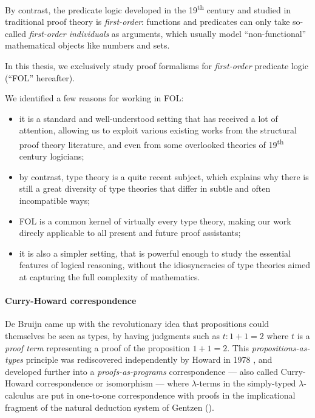 By contrast, the predicate logic developed in the 19\textsuperscript{th} century
and studied in traditional proof theory is \emph{first-order}: functions and
predicates can only take so-called \emph{first-order individuals} as arguments,
which usually model ``non-functional'' mathematical objects like numbers and
sets.

\begin{emphpar}
In this thesis, we exclusively study proof formalisms for \emph{first-order}
predicate logic (``FOL'' hereafter).
\end{emphpar}

We identified a few reasons for working in FOL:
\begin{itemize}
  \item it is a standard and well-understood setting that has received a lot of
  attention, allowing us to exploit various existing works from the structural
  proof theory literature, and even from some overlooked theories of
  19\textsuperscript{th} century logicians;
  \item by contrast, type theory is a quite recent subject, which explains why there is still a
  great diversity of type theories that differ in subtle and often incompatible
  ways;
  \item FOL is a common kernel of virtually every type theory, making our work
  direcly applicable to all present and future proof assistants;
  \item it is also a simpler setting, that is powerful enough to study the
  essential features of logical reasoning, without the idiosyncracies of type
  theories aimed at capturing the full complexity of mathematics.
\end{itemize}

\paragraph{Curry-Howard correspondence}

De Bruijn came up with the revolutionary idea that propositions could themselves
be seen as types, by having judgments such as $t : 1 + 1 = 2$ where $t$ is a
\emph{proof term} representing a proof of the proposition $1 + 1 = 2$. This
\emph{propositions-as-types} principle was rediscovered independently by Howard
in 1978 , and developed further into a
\emph{proofs-as-programs} correspondence --- also called Curry-Howard
correspondence or isomorphism --- where $\lambda$-terms in the simply-typed
$\lambda$-calculus are put in one-to-one correspondence with proofs in the
implicational fragment of the natural deduction system  of
Gentzen ().

